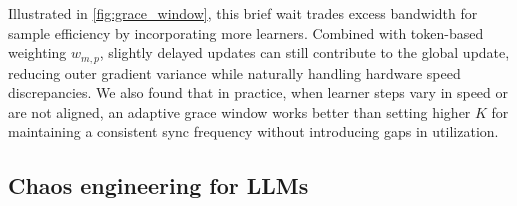 \documentclass[11pt, a4paper, twocolumn, copyright, google]{google}
\begin{document}


Illustrated in \autoref{fig:grace_window}, this brief wait trades excess bandwidth for sample efficiency by incorporating more learners. Combined with token-based weighting $w_{m,p}$, slightly delayed updates can still contribute to the global update, reducing outer gradient variance while naturally handling hardware speed discrepancies. We also found that in practice, when learner steps vary in speed or are not aligned, an adaptive grace window works better than setting higher $K$ for maintaining a consistent sync frequency without introducing gaps in utilization.


\subsection{Chaos engineering for LLMs}\label{sec:simulating_failures}
\end{document}
